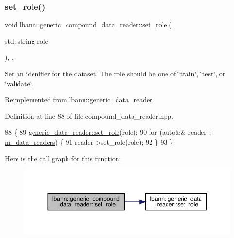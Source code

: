 \subsubsection{\texorpdfstring{set\+\_\+role()}{set\_role()}}
{\footnotesize\ttfamily void lbann\+::generic\+\_\+compound\+\_\+data\+\_\+reader\+::set\+\_\+role (\begin{DoxyParamCaption}\item[{std\+::string}]{role }\end{DoxyParamCaption})\hspace{0.3cm}{\ttfamily [inline]}, {\ttfamily [override]}, {\ttfamily [virtual]}}

Set an idenifier for the dataset. The role should be one of \char`\"{}train\char`\"{}, \char`\"{}test\char`\"{}, or \char`\"{}validate\char`\"{}. 

Reimplemented from \hyperlink{classlbann_1_1generic__data__reader_adeb9413be971a0c1454fdeb46fea0716}{lbann\+::generic\+\_\+data\+\_\+reader}.



Definition at line 88 of file compound\+\_\+data\+\_\+reader.\+hpp.


\begin{DoxyCode}
88                                          \{
89     \hyperlink{classlbann_1_1generic__data__reader_adeb9413be971a0c1454fdeb46fea0716}{generic\_data\_reader::set\_role}(role);
90     \textcolor{keywordflow}{for} (\textcolor{keyword}{auto}&& reader : \hyperlink{classlbann_1_1generic__compound__data__reader_a9815e94ade5873415fd766e09d956d5b}{m\_data\_readers}) \{
91       reader->set\_role(role);
92     \}
93   \}
\end{DoxyCode}
Here is the call graph for this function\+:\nopagebreak
\begin{figure}[H]
\begin{center}
\leavevmode
\includegraphics[width=350pt]{classlbann_1_1generic__compound__data__reader_a19302078a484337e86b1549b48ef13ad_cgraph}
\end{center}
\end{figure}
\mbox{\label{classlbann_1_1generic__compound__data__reader_a6b8288801972561d9758337c61eb39b8}} 
